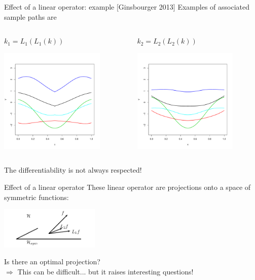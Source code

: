 \begin{frame}{Effect of a linear operator: example [Ginsbourger 2013]}
Examples of associated sample paths are

\begin{columns}[c]
\begin{column}{5cm}
\begin{center}
 $k_1 = L_1(L_1(k))$
\end{center}
 \includegraphics[height=5cm]{3_gaussian_process_regression/figures/R/p2-sym1}
\end{column}
\begin{column}{5cm}
\begin{center}
 $k_2= L_2(L_2(k))$
\end{center}
 \includegraphics[height=5cm]{3_gaussian_process_regression/figures/R/p2-sym2}
\end{column}
\end{columns}
The differentiability is not always respected!
\end{frame}

\begin{frame}{Effect of a linear operator}
These linear operator are projections onto a space of symmetric functions:
\begin{center}
\vspace{0.5cm}
 \includegraphics[height=2cm]{3_gaussian_process_regression/figures/latexdraw/proj-sym}
\vspace{0.5cm}
\end{center}
Is there an optimal projection?\\
\vspace{0.5cm}
\alert{$\Rightarrow$ This can be difficult... but it raises interesting questions!}
\end{frame}

